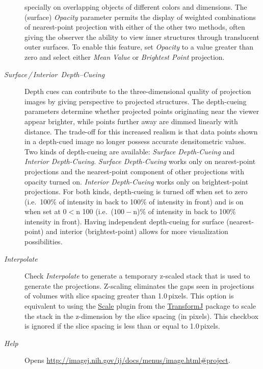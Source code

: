 \begin{description}
specially on overlapping objects of different colors and dimensions.
The (surface) \emph{Opacity} parameter permits the display of weighted
combinations of nearest-point projection with either of the other
two methods, often giving the observer the ability to view inner structures
through translucent outer surfaces. To enable this feature, set \emph{Opacity}
to a value greater than zero and select either \emph{Mean Value} or
\emph{Brightest Point} projection.
\item [{\emph{Surface\,/\,Interior\ Depth--Cueing}}] Depth cues can
contribute to the three-dimensional quality of projection images by
giving perspective to projected structures. The depth-cueing parameters
determine whether projected points originating near the viewer appear
brighter, while points further away are dimmed linearly with distance.
The trade-off for this increased realism is that data points shown
in a depth-cued image no longer possess accurate densitometric values.
Two kinds of depth-cueing are available: \emph{Surface Depth-Cueing}
and \emph{Interior Depth-Cueing}. \emph{Surface Depth-Cueing} works
only on nearest-point projections and the nearest-point component
of other projections with opacity turned on. \emph{Interior Depth-Cueing
}works only on brightest-point projections. For both kinds, depth-cueing
is turned off when set to zero (i.e.\ 100\% of intensity in back
to 100\% of intensity in front) and is on when set at $0<$n 100 (i.e.\ ($100-$n)\%
of intensity in back to 100\% intensity in front). Having independent
depth-cueing for surface (nearest-point) and interior (brightest-point)
allows for more visualization possibilities.
\item [{\emph{Interpolate}}] Check \emph{Interpolate} to generate a temporary
z-scaled stack that is used to generate the projections. Z-scaling
eliminates the gaps seen in projections of volumes with slice spacing
greater than 1.0\,pixels. This option is equivalent to using the
\href{http://www.imagescience.org/meijering/software/transformj/scale.html}{Scale}
plugin from the \href{http://www.imagescience.org/meijering/software/transformj/}{TransformJ}
package to scale the stack in the z-dimension by the slice spacing
(in pixels). This checkbox is ignored if the slice spacing is less
than or equal to 1.0\,pixels.
\item [{\emph{Help}}] Opens \url{http://imagej.nih.gov/ij/docs/menus/image.html#project}.
\end{description}



